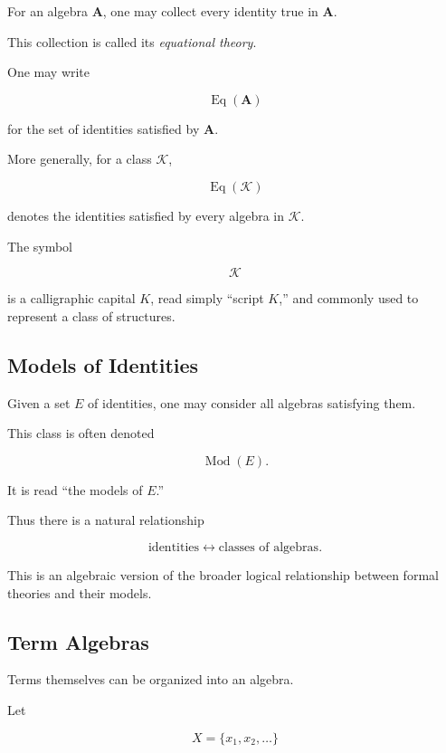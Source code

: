 For an algebra \(\mathbf A\), one may collect every identity true in
\(\mathbf A\).

This collection is called its \emph{equational theory}.

One may write

\[ \operatorname{Eq}(\mathbf A) \]

for the set of identities satisfied by \(\mathbf A\).

More generally, for a class \(\mathcal K\),

\[ \operatorname{Eq}(\mathcal K) \]

denotes the identities satisfied by every algebra in \(\mathcal K\).

The symbol

\[ \mathcal K \]

is a calligraphic capital \(K\), read simply ``script \(K\),'' and commonly
used to represent a class of structures.

\subsection{Models of Identities}
\label{subsec:models-identities}

Given a set \(E\) of identities, one may consider all algebras satisfying
them.

This class is often denoted

\[ \operatorname{Mod}(E). \]

It is read ``the models of \(E\).''

Thus there is a natural relationship

\[
\text{identities}
\longleftrightarrow
\text{classes of algebras}.
\]

This is an algebraic version of the broader logical relationship between
formal theories and their models.

\subsection{Term Algebras}
\label{subsec:term-algebras}

Terms themselves can be organized into an algebra.

Let

\[ X=\{x_1,x_2,\ldots\} \]

